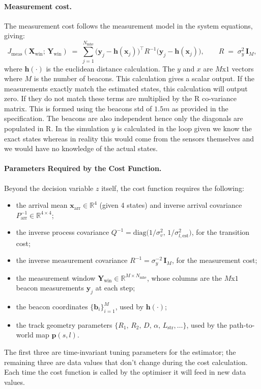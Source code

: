 \documentclass{article}
\begin{document}
\paragraph{Measurement cost.}
The measurement cost follows the measurement model in the system equations, giving:
\begin{equation}
    J_{\text{meas}}(\mathbf{X}_{\text{win}};\,\mathbf{Y}_{\text{win}}) \;=\; \sum_{j=1}^{N_{\text{mhe}}}
        \bigl(\mathbf{y}_{j} - \mathbf{h}(\mathbf{x}_{j})\bigr)^{\top}\!R^{-1}\bigl(\mathbf{y}_{j} - \mathbf{h}(\mathbf{x}_{j})\bigr),
    \qquad
    R \;=\; \sigma_{y}^{2}\,\mathbf{I}_{M},
    \label{eq:cost_meas}
\end{equation}
where $\mathbf{h}(\cdot)$ is the euclidean distance calculation. The $y$ and $x$ are $M$x$1$ vectors where $M$ is the number of beacons. This calculation gives a scalar output. If the measurements exactly match the estimated states, this calculation will output zero. If they do not match these terms are multiplied by the R co-variance matrix. This is formed using the beacons std of $1.5m$ as provided in the specification. The beacons are also independent hence only the diagonals are populated in R. In the simulation $y$ is calculated in the loop given we know the exact states whereas in reality this would come from the sensors themselves and we would have no knowledge of the actual states. 

\paragraph{Parameters Required by the Cost Function.}
Beyond the decision variable $z$ itself, the cost function requires the following:
\begin{itemize}
    \item the arrival mean $\mathbf{x}_{\text{arr}}\in\mathbb{R}^{4}$ (given 4 states) and inverse arrival covariance $P_{\text{arr}}^{-1}\in\mathbb{R}^{4\times 4}$;
    \item the inverse process covariance $Q^{-1} = \mathrm{diag}\!\bigl(1/\sigma_{v}^{2},\,1/\sigma_{l,\text{est}}^{2}\bigr)$, for the transition cost;
    \item the inverse measurement covariance $R^{-1} = \sigma_{y}^{-2}\,\mathbf{I}_{M}$, for the measurement cost;
    \item the measurement window $\mathbf{Y}_{\text{win}}\in\mathbb{R}^{M\times N_{\text{mhe}}}$, whose columns are the $M$x$1$ beacon measurements $\mathbf{y}_{j}$ at each step;
    \item the beacon coordinates $\{\mathbf{b}_{i}\}_{i=1}^{M}$, used by $\mathbf{h}(\cdot)$;
    \item the track geometry parameters $\{R_{1},\,R_{2},\,D,\,\alpha,\,L_{\text{str}},\ldots\}$, used by the path-to-world map $\mathbf{p}(s,l)$.
\end{itemize}
The first three are time-invariant tuning parameters for the estimator; the remaining three are data values that don't change during the cost calculation. Each time the cost function is called by the optimiser it will feed in new data values. 
\end{document}

